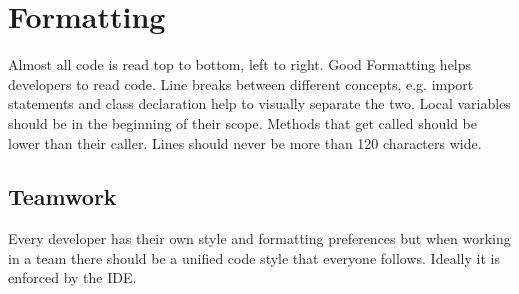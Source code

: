 \section{Formatting}
Almost all code is read top to bottom, left to right. Good Formatting helps developers to read code. Line breaks between different concepts, e.g. import statements and class declaration help to visually separate the two. Local variables should be in the beginning of their scope. Methods that get called should be lower than their caller. Lines should never be more than 120 characters wide.

\subsection{Teamwork}
Every developer has their own style and formatting preferences but when working in a team there should be a unified code style that everyone follows. Ideally it is enforced by the IDE.
